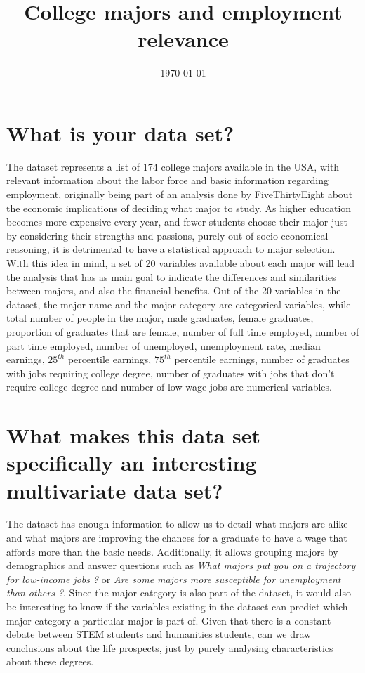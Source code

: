 \documentclass[11pt,a4paper]{report}
\title{College majors and employment relevance}
\date{\today}
\begin{document}
\newpage
\maketitle

\section*{What is your data set?}
The dataset represents a list of 174 college majors available in the USA, with relevant information about the labor force and basic information regarding employment, originally being part of an analysis done by FiveThirtyEight \cite{fiveThirty} about the economic implications of deciding what major to study. As higher education becomes more expensive every year, and fewer students choose their major just by considering their strengths and passions, purely out of socio-economical reasoning, it is detrimental to have a statistical approach to major selection. With this idea in mind, a set of 20 variables available about each major will lead the analysis that has as main goal to indicate the differences and similarities between majors, and also the financial benefits. Out of the 20 variables in the dataset, the major name and the major category are categorical variables, while total number of people in the major, male graduates, female graduates, proportion of graduates that are female, number of full time employed, number of part time employed, number of unemployed, unemployment rate, median earnings, $25^{th}$ percentile earnings, $75^{th}$ percentile earnings, number of graduates with jobs requiring college degree, number of graduates with jobs that don't require college degree and number of low-wage jobs are numerical variables.
\section*{What makes this data set specifically an interesting multivariate data set?}
The dataset has enough information to allow us to detail what majors are alike and what majors are improving the chances for a graduate to have a wage that affords more than the basic needs. Additionally, it allows grouping majors by demographics and answer questions such as \textit{What majors put you on a trajectory for low-income jobs ?} or \textit{Are some majors more susceptible for unemployment than others ?}. Since the major category is also part of the dataset, it would also be interesting to know if the variables existing in the dataset can predict which major category a particular major is part of. Given that there is a constant debate between STEM students and humanities students, can we draw conclusions about the life prospects, just by purely analysing characteristics about these degrees.
\end{document}
